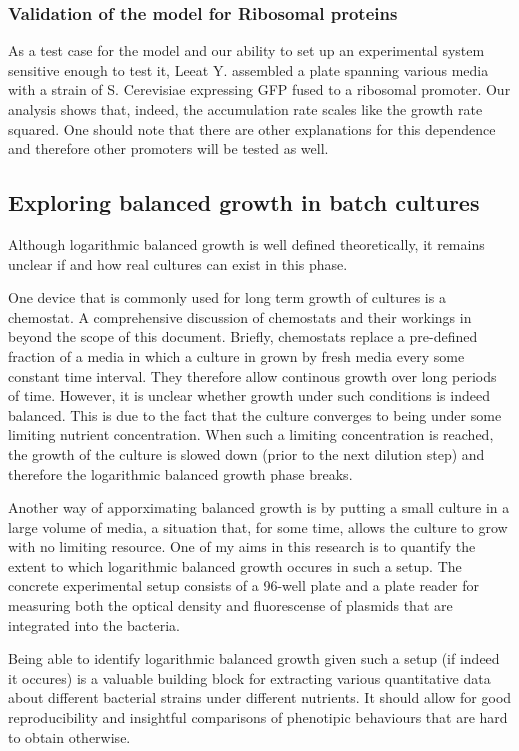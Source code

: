 \documentclass{report}
\begin{document}
\subsubsection{Validation of the model for Ribosomal proteins}
As a test case for the model and our ability to set up an experimental system sensitive enough to test it, Leeat Y. assembled a plate spanning various media with a strain of S. Cerevisiae expressing GFP fused to a ribosomal promoter.
Our analysis shows that, indeed, the accumulation rate scales like the growth rate squared.
One should note that there are other explanations for this dependence and therefore other promoters will be tested as well.
\subsection{Exploring balanced growth in batch cultures}
Although logarithmic balanced growth is well defined theoretically, it remains unclear if and how real cultures can exist in this phase.

One device that is commonly used for long term growth of cultures is a chemostat.
A comprehensive discussion of chemostats and their workings in beyond the scope of this document.
Briefly, chemostats replace a pre-defined fraction of a media in which a culture in grown by fresh media every some constant time interval.
They therefore allow continous growth over long periods of time.
However, it is unclear whether growth under such conditions is indeed balanced.
This is due to the fact that the culture converges to being under some limiting nutrient concentration.
When such a limiting concentration is reached, the growth of the culture is slowed down (prior to the next dilution step) and therefore the logarithmic balanced growth phase breaks.

Another way of apporximating balanced growth is by putting a small culture in a large volume of media, a situation that, for some time, allows the culture to grow with no limiting resource.
One of my aims in this research is to quantify the extent to which logarithmic balanced growth occures in such a setup.
The concrete experimental setup consists of a 96-well plate and a plate reader for measuring both the optical density and fluorescense of plasmids that are integrated into the bacteria.

Being able to identify logarithmic balanced growth given such a setup (if indeed it occures) is a valuable building block for extracting various quantitative data about different bacterial strains under different nutrients.
It should allow for good reproducibility and insightful comparisons of phenotipic behaviours that are hard to obtain otherwise.
\end{document}
